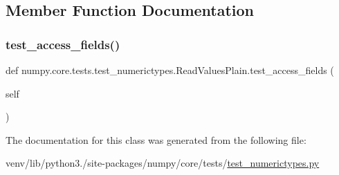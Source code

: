 \subsection{Member Function Documentation}
\mbox{\label{classnumpy_1_1core_1_1tests_1_1test__numerictypes_1_1ReadValuesPlain_a73b926e899f7aae596067c37988e35f7}} 
\subsubsection{\texorpdfstring{test\+\_\+access\+\_\+fields()}{test\_access\_fields()}}
{\footnotesize\ttfamily def numpy.\+core.\+tests.\+test\+\_\+numerictypes.\+Read\+Values\+Plain.\+test\+\_\+access\+\_\+fields (\begin{DoxyParamCaption}\item[{}]{self }\end{DoxyParamCaption})}



The documentation for this class was generated from the following file\+:\begin{DoxyCompactItemize}
\item 
venv/lib/python3./site-\/packages/numpy/core/tests/\hyperlink{test__numerictypes_8py}{test\+\_\+numerictypes.\+py}\end{DoxyCompactItemize}
